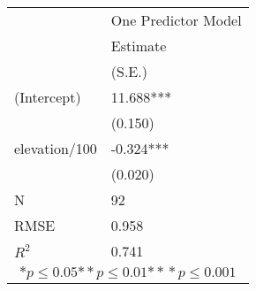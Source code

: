 \begin{tabular}{*{2}{l}}
\hline
                  & One Predictor Model   \tabularnewline
                   &Estimate \tabularnewline
                 &(S.E.) \tabularnewline
 \hline
 \hline
   (Intercept)     &11.688*** \tabularnewline
                 &(0.150)  \tabularnewline
   elevation/100    &-0.324*** \tabularnewline
                 &(0.020)  \tabularnewline
 \hline
 N                 &92       \tabularnewline
 RMSE             &0.958   \tabularnewline
 $R^2$             &0.741   \tabularnewline
 \hline
\hline
 
 \multicolumn{2}{c}{${*  p}\le 0.05$${*\!\!*  p}\le 0.01$${*\!\!*\!\!*  p}\le 0.001$}\tabularnewline
 \end{tabular}